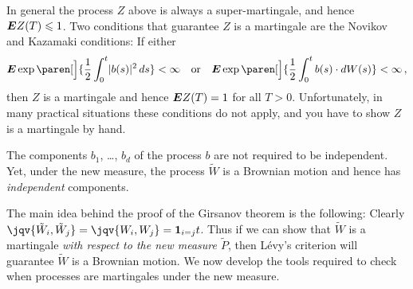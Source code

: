 \begin{remark}
  In general the process $Z$ above is always a super-martingale, and hence $\bm{E} Z(T) \leqslant 1$.
  Two conditions that guarantee $Z$ is a martingale are the Novikov and Kazamaki conditions:
  If either
  \begin{equation*}
    \E \exp\paren[\Big]{ \frac{1}{2} \int_0^t \abs{b(s)}^2 \, ds } < \infty
    \quad\text{or}\quad
    \E \exp\paren[\Big]{ \frac{1}{2} \int_0^t b(s) \cdot dW(s) } < \infty\,,
  \end{equation*}
  then $Z$ is a martingale and hence $\bm{E} Z(T) = 1$ for all $T > 0$.
  Unfortunately, in many practical situations these conditions do not apply, and you have to show $Z$ is a martingale by hand.
\end{remark}
\begin{remark}
  The components $b_1$, \dots, $b_d$ of the process $b$ are not required to be independent.
  Yet, under the new measure, the process $\tilde W$ is a Brownian motion and hence has \emph{independent} components.
\end{remark}

The main idea behind the proof of the Girsanov theorem is the following:
Clearly $\jqv{\tilde W_i, \tilde W_j} = \jqv{W_i, W_j} = \one_{i= j} t$.
Thus if we can show that $\tilde W$ is a martingale \emph{with respect to the new measure $\tilde P$}, then L\'evy's criterion will guarantee $\tilde W$ is a Brownian motion.
We now develop the tools required to check when processes are martingales under the new measure.

